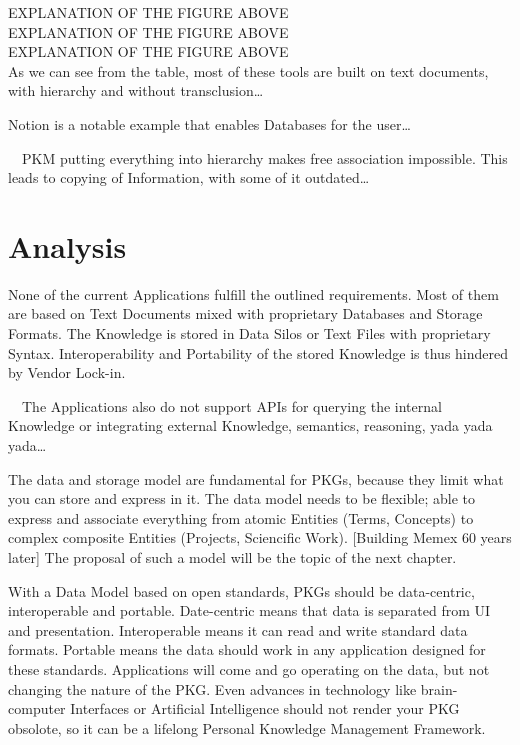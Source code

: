 EXPLANATION OF THE FIGURE ABOVE \\
EXPLANATION OF THE FIGURE ABOVE \\
EXPLANATION OF THE FIGURE ABOVE \\


As we can see from the table, most of these tools are built on text documents, with hierarchy and without transclusion…

Notion is a notable example that enables Databases for the user…

~~PKM putting everything into hierarchy makes free association impossible. This leads to copying of Information, with some of it outdated…~~

\section{Analysis}

None of the current Applications fulfill the outlined requirements. Most of them are based on Text Documents mixed with proprietary Databases and Storage Formats. The Knowledge is stored in Data Silos or Text Files with proprietary Syntax. Interoperability and Portability of the stored Knowledge is thus hindered by Vendor Lock-in.

~~The Applications also do not support APIs for querying the internal Knowledge or integrating external Knowledge, semantics, reasoning, yada yada yada…~~

The data and storage model are fundamental for PKGs, because they limit what you can store and express in it. The data model needs to be flexible; able to express and associate everything from atomic Entities (Terms, Concepts) to complex composite Entities (Projects, Sciencific Work). [Building Memex 60 years later] The proposal of such a model will be the topic of the next chapter.

With a Data Model based on open standards, PKGs should be data-centric, interoperable and portable. Date-centric means that data is separated from UI and presentation. Interoperable means it can read and write standard data formats. Portable means the data should work in any application designed for these standards. Applications will come and go operating on the data, but not changing the nature of the PKG. Even advances in technology like brain-computer Interfaces or Artificial Intelligence should not render your PKG obsolote, so it can be a lifelong Personal Knowledge Management Framework.